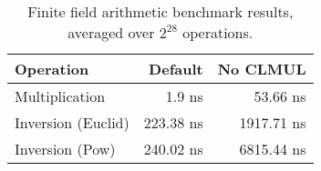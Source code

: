\begin{table}[hbt]
\centering
\begin{tabular}{lrr}
\toprule
\textbf{Operation} & \textbf{Default} & \textbf{No CLMUL} \\
\midrule
Multiplication     & 1.9 ns & 53.66 ns \\
Inversion (Euclid) & 223.38 ns & 1917.71 ns \\
Inversion (Pow)    & 240.02 ns & 6815.44 ns \\
\bottomrule
\end{tabular}
\caption{Finite field arithmetic benchmark results, averaged over $2^{28}$ operations.}
\label{tab:arithmetic_benchmark}
\end{table}

